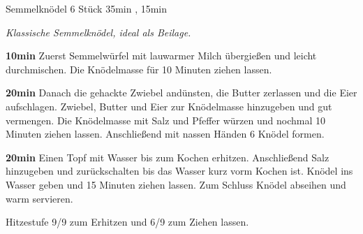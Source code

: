 \documentclass[../recipe-collections/cooking.tex]{subfiles}
\begin{document}
\begin{recipe}{Semmelknödel} {6 Stück } {35min , 15min }

  \freeform{}\textit{Klassische Semmelknödel, ideal als Beilage.}


  \textbf{10min}
  Zuerst Semmelwürfel mit lauwarmer Milch übergießen und leicht durchmischen.
  Die Knödelmasse für 10 Minuten ziehen lassen.


  \textbf{20min}
  Danach die gehackte Zwiebel andünsten, die Butter zerlassen und die Eier aufschlagen.
  Zwiebel, Butter und Eier zur Knödelmasse hinzugeben und gut vermengen.
  Die Knödelmasse mit Salz und Pfeffer würzen und nochmal 10 Minuten ziehen lassen.
  Anschließend mit nassen Händen 6 Knödel formen.

  \newstep{}\textbf{20min}
  Einen Topf mit Wasser bis zum Kochen erhitzen.
  Anschließend Salz hinzugeben und zurückschalten bis das Wasser kurz vorm Kochen ist.
  Knödel ins Wasser geben und 15 Minuten ziehen lassen.
  Zum Schluss Knödel abseihen und warm servieren.

  \freeform{}\hrulefill{}

  \freeform{}
  Hitzestufe 9/9 zum Erhitzen und 6/9 zum Ziehen lassen.

\end{recipe}
\end{document}
